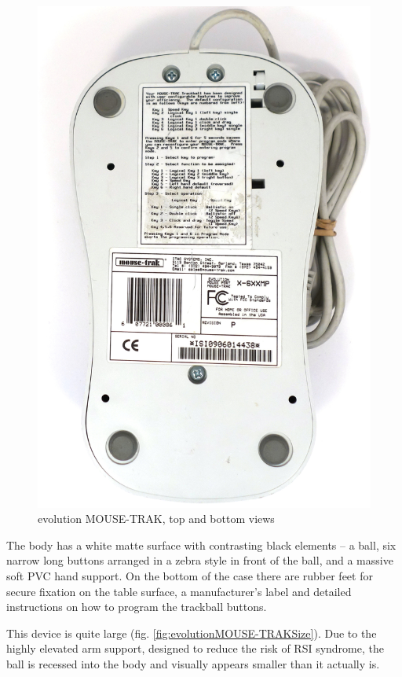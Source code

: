 \documentclass[11pt, a4paper]{article}
\begin{document}
\begin{figure}[h]
    \includegraphics[scale=0.35]{1997_mousetrak_evolution/bottom_60.jpg}
    \caption{evolution MOUSE-TRAK, top and bottom views}
     \label{fig:evolutionMOUSE-TRAKTopBottom}
\end{figure}

The body has a white matte surface with contrasting black elements -- a ball, six narrow long buttons arranged in a zebra style in front of the ball, and a massive soft PVC hand support. On the bottom of the case there are rubber feet for secure fixation on the table surface, a manufacturer's label and detailed instructions on how to program the trackball buttons.

This device is quite large (fig. \ref{fig:evolutionMOUSE-TRAKSize}). Due to the highly elevated arm support, designed to reduce the risk of RSI syndrome, the ball is recessed into the body and visually appears smaller than it actually is.
\end{document}
